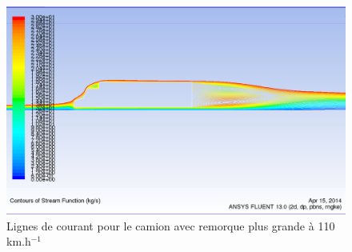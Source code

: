 \begin{figure}[!h]
\centering
\includegraphics[scale=0.4]{resultsCx/remorque2_110_stream.png}
\caption{Lignes de courant pour le camion avec remorque plus grande à 110 km.h$^{-1}$}
\label{figRem2Stream110}
\end{figure}
\clearpage

